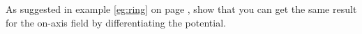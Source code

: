         As suggested in example \ref{eg:ring} on page \pageref{eg:ring},
        show that you can get the same result for the on-axis field
        by differentiating the potential.
